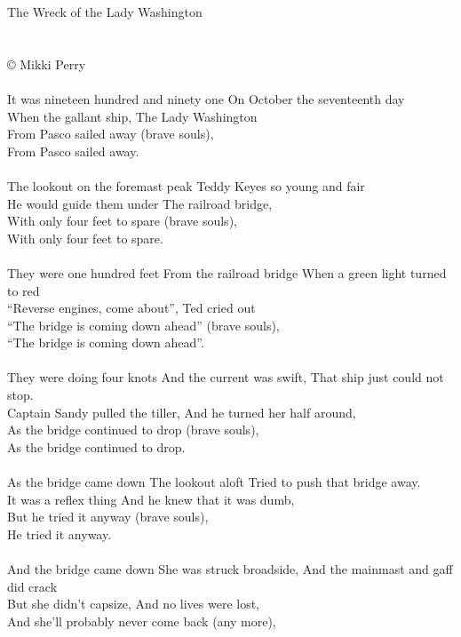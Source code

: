 \documentclass[letterpaper,9pt]{article}
\begin{document}
\newpage
{}
\huge
The Wreck of the Lady Washington\\
\\
\large
\\© Mikki Perry
\\
\\It was nineteen hundred and ninety one On October the seventeenth day
\\When the gallant ship, The Lady Washington
\\From Pasco sailed away (brave souls),
\\From Pasco sailed away.
\\
\\The lookout on the foremast peak Teddy Keyes so young and fair
\\He would guide them under The railroad bridge,
\\With only four feet to spare (brave souls),
\\With only four feet to spare.
\\
\\They were one hundred feet From the railroad bridge When a green light turned to red
\\“Reverse engines, come about”, Ted cried out
\\“The bridge is coming down ahead” (brave souls),
\\“The bridge is coming down ahead”.
\\
\\They were doing four knots And the current was swift, That ship just could not stop. 
\\Captain Sandy pulled the tiller, And he turned her half around,
\\As the bridge continued to drop (brave souls),
\\As the bridge continued to drop.
\\
\\As the bridge came down The lookout aloft Tried to push that bridge away.
\\It was a reflex thing And he knew that it was dumb,
\\But he tried it anyway (brave souls),
\\He tried it anyway.
\\
\\And the bridge came down She was struck broadside, And the mainmast and gaff did crack
\\But she didn't capsize, And no lives were lost,
\\And she'll probably never come back (any more),
\end{document}
